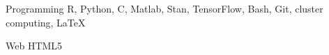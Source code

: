 

\begin{cvskills}

  \cvskill
    {Programming} %
    {R, Python, C, Matlab, Stan, TensorFlow, Bash, Git, cluster computing, \LaTeX} %

  \cvskill
    {Web} %
    {HTML5} %

\end{cvskills}

